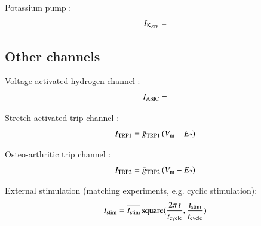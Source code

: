 Potassium pump \citep{UNKNOWN}:
\begin{equation}
  I_{\rm K_{ATP}} =
\end{equation}

\subsection{Other channels}
\label{sec:other-channels}

Voltage-activated hydrogen channel \citep{UNKNOWN}:
\begin{equation}
  I_{\rm ASIC} =
\end{equation}

Stretch-activated trip channel \citep{UNKNOWN}:
\begin{equation}
  I_{\rm TRP1} = \bar{g}_{\rm TRP1}\, (V_{\rm m} - E_{\rm ?})
\end{equation}

Osteo-arthritic trip channel \citep{UNKNOWN}:
\begin{equation}
  I_{\rm TRP2} = \bar{g}_{\rm TRP2}\, (V_{\rm m} - E_{\rm ?})
\end{equation}

External stimulation (matching experiments, e.g. cyclic stimulation):
\begin{equation}
I_{\rm stim} = \overline{I_{\rm stim}}\, {\rm square}(\frac{2 \pi\,
  t}{t_{\rm cycle}}, \frac{t_{\rm stim}}{t_{\rm cycle}})
\end{equation}


